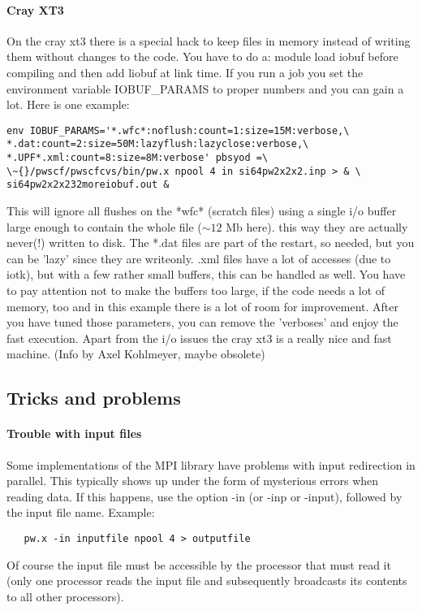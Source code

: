 \documentclass[12pt,a4paper]{article}
\begin{document}
\paragraph{Cray XT3}
On the cray xt3 there is a special hack to keep files in
memory instead of writing them without changes to the code.
You have to do a: 
module load iobuf
before compiling and then add liobuf at link time.
If you run a job you set the environment variable 
IOBUF\_PARAMS to proper numbers and you can gain a lot.
Here is one example:
\begin{verbatim}
env IOBUF_PARAMS='*.wfc*:noflush:count=1:size=15M:verbose,\
*.dat:count=2:size=50M:lazyflush:lazyclose:verbose,\
*.UPF*.xml:count=8:size=8M:verbose' pbsyod =\
\~{}/pwscf/pwscfcvs/bin/pw.x npool 4 in si64pw2x2x2.inp > & \
si64pw2x2x232moreiobuf.out &
\end{verbatim}
This will ignore all flushes on the *wfc* (scratch files) using a
single i/o buffer large enough to contain the whole file ($\sim 12$ Mb here).
this way they are actually never(!) written to disk.
The *.dat files are part of the restart, so needed, but you can be
'lazy' since they are writeonly. .xml files have a lot of accesses
(due to iotk), but with a few rather small buffers, this can be
handled as well. You have to pay attention not to make the buffers
too large, if the code needs a lot of memory, too and in this example
there is a lot of room for improvement. After you have tuned those
parameters, you can remove the 'verboses' and enjoy the fast execution.
Apart from the i/o issues the cray xt3 is a really nice and fast machine.
(Info by Axel Kohlmeyer, maybe obsolete)

\subsection{Tricks and problems}

\paragraph{Trouble with input files}
Some implementations of the MPI library have problems with input 
redirection in parallel. This typically shows up under the form of
mysterious errors when reading data. If this happens, use the option 
-in (or -inp or -input), followed by the input file name. 
Example:
\begin{verbatim}
   pw.x -in inputfile npool 4 > outputfile
\end{verbatim} 
Of course the 
input file must be accessible by the processor that must read it
(only one processor reads the input file and subsequently broadcasts
its contents to all other processors).
\end{document}
